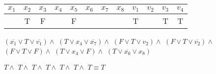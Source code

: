 \documentclass[12pt]{article}
\begin{document}
\begin{flushleft}
\begin{center}
      \begin{tabular}{|c|c|c|c|c|c|c|c|c|c|c|c|}\hline
         $x_1$ & $x_2$ & $x_3$ & $x_4$ & $x_5$ & $x_6$ & $x_7$ & $x_8$ & $v_1$ & $v_2$ & $v_3$ & $v_4$ \\\hline
         & T & F & & F & & & & T & & T & T \\\hline      
      \end{tabular}

      $\left(\overline{x_1} \lor T \lor \overline{v_1}\right) \land$
      $\left(T \lor x_4 \lor \overline{x_7}\right) \land$
      $\left(F \lor T \lor v_2\right) \land$
      $\left(F \lor T \lor \overline{v_2}\right) \land$
      $\left(F \lor T \lor F\right) \land$
      $\left(T \lor x_4 \lor F\right) \land$
      $\left(T\lor \overline{x_6} \lor x_8\right)$

      $T \land$
      $T \land$
      $T \land$
      $T \land$
      $T \land$
      $T \land$
      $T \equiv T$
   \end{center}
\end{flushleft}
\end{document}
